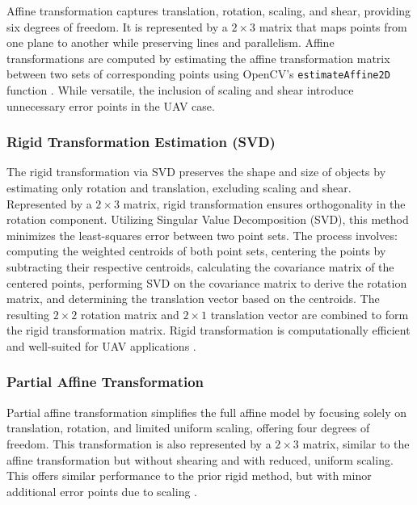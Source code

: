 Affine transformation captures translation, rotation, scaling, and shear, providing six degrees of freedom. It is represented by a  \(2 \times 3\) matrix that maps points from one plane to another while preserving lines and parallelism. Affine transformations are computed by estimating the affine transformation matrix between two sets of corresponding points using OpenCV's \texttt{estimateAffine2D} function \cite{opencv_warp_affine}. While versatile, the inclusion of scaling and shear introduce unnecessary error points in the UAV case. 

\subsubsection{Rigid Transformation Estimation (SVD)}

The rigid transformation via SVD preserves the shape and size of objects by estimating only rotation and translation, excluding scaling and shear. Represented by a  \(2 \times 3\) matrix, rigid transformation ensures orthogonality in the rotation component. Utilizing Singular Value Decomposition (SVD), this method minimizes the least-squares error between two point sets. The process involves: computing the weighted centroids of both point sets, centering the points by subtracting their respective centroids, calculating the covariance matrix of the centered points, performing SVD on the covariance matrix to derive the rotation matrix, and determining the translation vector based on the centroids. The resulting \(2 \times 2\) rotation matrix and \(2 \times 1\) translation vector are combined to form the rigid transformation matrix. Rigid transformation is computationally efficient and well-suited for UAV applications \cite{sorkine2017least_squares}.


\subsubsection{Partial Affine Transformation}

Partial affine transformation simplifies the full affine model by focusing solely on translation, rotation, and limited uniform scaling, offering four degrees of freedom. This transformation is also represented by a \(2 \times 3\) matrix, similar to the affine transformation but without shearing and with reduced, uniform scaling. This offers similar performance to the prior rigid method, but with minor additional error points due to scaling \cite{opencv_warp_affine}.


